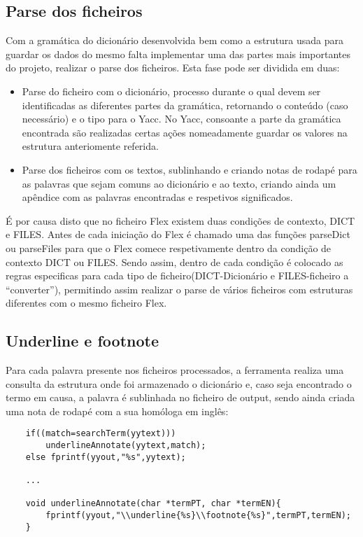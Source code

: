 \documentclass{llncs}
\begin{document}
\subsection{Parse dos ficheiros}
Com a gramática do dicionário desenvolvida bem como a estrutura usada para guardar os dados do mesmo falta implementar uma das partes mais importantes do projeto, realizar o parse dos ficheiros. Esta fase pode ser dividida em duas:
\begin{itemize}
\item Parse do ficheiro com o dicionário, processo durante o qual devem ser identificadas as diferentes partes da gramática, retornando o conteúdo (caso necessário) e o tipo para o Yacc. No Yacc, consoante a parte da gramática encontrada são realizadas certas ações nomeadamente guardar os valores na estrutura anteriomente referida.
\item Parse dos ficheiros com os textos, sublinhando e criando notas de rodapé para as palavras que sejam comuns ao dicionário e ao texto, criando ainda um apêndice com as palavras encontradas e respetivos significados.
\end{itemize}

É por causa disto que no ficheiro Flex existem duas condições de contexto, DICT e FILES. Antes de cada iniciação do Flex é chamado uma das funções parseDict ou parseFiles para que o Flex comece respetivamente dentro da condição de contexto DICT ou FILES. Sendo assim, dentro de cada condição é colocado as regras especificas para cada tipo de ficheiro(DICT-Dicionário e FILES-ficheiro a ``converter''), permitindo assim realizar o parse de vários ficheiros com estruturas diferentes com o mesmo ficheiro Flex.

\subsection{Underline e footnote}
Para cada palavra presente nos ficheiros processados, a ferramenta realiza uma consulta da estrutura onde foi armazenado o dicionário e, caso seja encontrado o termo em causa, a palavra é sublinhada no ficheiro de output, sendo ainda criada uma nota de rodapé com a sua homóloga em inglês: 
\begin{verbatim}
    if((match=searchTerm(yytext)))
        underlineAnnotate(yytext,match);          
    else fprintf(yyout,"%s",yytext);

    ...

    void underlineAnnotate(char *termPT, char *termEN){
        fprintf(yyout,"\\underline{%s}\\footnote{%s}",termPT,termEN);
    }
\end{verbatim}
\end{document}
